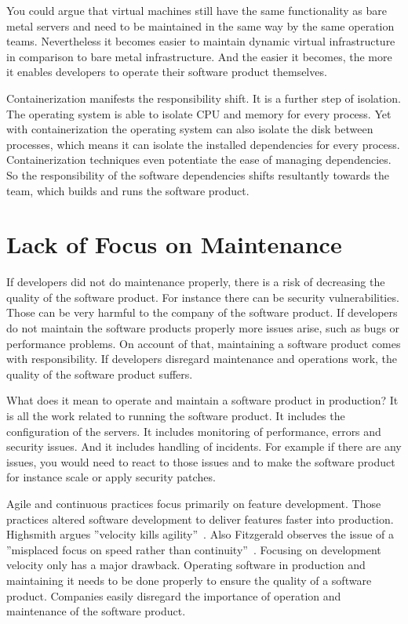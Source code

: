 You could argue that virtual machines still have the same functionality as bare metal
servers and need to be maintained in the same way by the same operation
teams. Nevertheless it becomes easier to maintain dynamic virtual
infrastructure~\cite{infra_as_code_platforms} in comparison to bare metal
infrastructure. And the easier it becomes, the more it enables developers to operate their
software product themselves.

Containerization manifests the responsibility shift. It is a further step of
isolation. The operating system is able to isolate CPU and memory for every process. Yet
with containerization the operating system can also isolate the disk between processes,
which means it can isolate the installed dependencies for every process. Containerization
techniques even potentiate the ease of managing dependencies. So the responsibility of the
software dependencies shifts resultantly towards the team, which builds and runs the
software product.


\section{Lack of Focus on Maintenance}

If developers did not do maintenance properly, there is a risk of decreasing the quality
of the software product. For instance there can be security vulnerabilities. Those can be
very harmful to the company of the software product. If developers do not maintain the
software products properly more issues arise, such as bugs or performance problems. On
account of that, maintaining a software product comes with responsibility. If developers
disregard maintenance and operations work, the quality of the software product suffers.

What does it mean to operate and maintain a software product in production? It is all the
work related to running the software product. It includes the configuration of the
servers. It includes monitoring of performance, errors and security issues. And it
includes handling of incidents. For example if there are any issues, you would need to
react to those issues and to make the software product for instance scale or apply
security patches.

Agile and continuous practices focus primarily on feature development. Those practices
altered software development to deliver features faster into production. Highsmith argues
”velocity kills agility”~\cite{velocity_kills}. Also Fitzgerald observes the issue of a
”misplaced focus on speed rather than continuity”~\cite{continuous_fitzgerald}. Focusing
on development velocity only has a major drawback. Operating software in production and
maintaining it needs to be done properly to ensure the quality of a software
product. Companies easily disregard the importance of operation and maintenance of the
software product.


